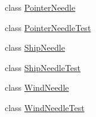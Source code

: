 \begin{DoxyCompactItemize}
\item 
class \mbox{\hyperlink{classorg_1_1jfree_1_1chart_1_1needle_1_1_pointer_needle}{Pointer\+Needle}}
\item 
class \mbox{\hyperlink{classorg_1_1jfree_1_1chart_1_1needle_1_1_pointer_needle_test}{Pointer\+Needle\+Test}}
\item 
class \mbox{\hyperlink{classorg_1_1jfree_1_1chart_1_1needle_1_1_ship_needle}{Ship\+Needle}}
\item 
class \mbox{\hyperlink{classorg_1_1jfree_1_1chart_1_1needle_1_1_ship_needle_test}{Ship\+Needle\+Test}}
\item 
class \mbox{\hyperlink{classorg_1_1jfree_1_1chart_1_1needle_1_1_wind_needle}{Wind\+Needle}}
\item 
class \mbox{\hyperlink{classorg_1_1jfree_1_1chart_1_1needle_1_1_wind_needle_test}{Wind\+Needle\+Test}}
\end{DoxyCompactItemize}
